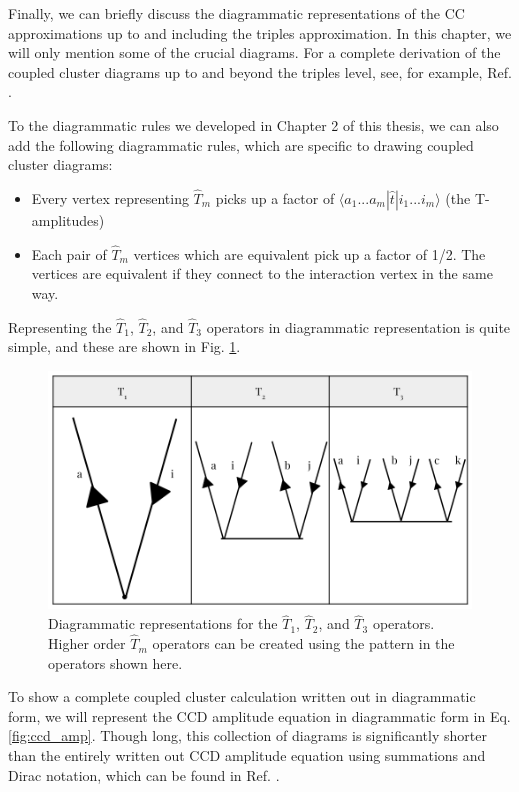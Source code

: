 Finally, we can briefly discuss the diagrammatic representations of the CC approximations up to and including the triples approximation. In this chapter, we will only mention some of the crucial diagrams. For a complete derivation of the coupled cluster diagrams up to and beyond the triples level, see, for example, Ref. \cite{Ref21}.

To the diagrammatic rules we developed in Chapter 2 of this thesis, we can also add the following diagrammatic rules, which are specific to drawing coupled cluster diagrams:

\begin{itemize}
    \item Every vertex representing $\hat{T}_m$ picks up a factor of $\langle a_1 ... a_m | \hat{t} | i_1 ... i_m \rangle$ (the T-amplitudes)
    \item Each pair of $\hat{T}_m$ vertices which are equivalent pick up a factor of 1/2.  The vertices are equivalent if they connect to the interaction vertex in the same way.
\end{itemize}

Representing the $\hat{T}_1$, $\hat{T}_2$, and $\hat{T}_3$ operators in diagrammatic representation is quite simple, and these are shown in Fig. \ref{fig:T_diagrams}.

\begin{figure}
    \centering
    \includegraphics[scale=0.25]{Images/Chapter3/CC_diagrams.png}
    \caption{Diagrammatic representations for the $\hat{T}_1$, $\hat{T}_2$, and $\hat{T}_3$ operators.  Higher order $\hat{T}_m$ operators can be created using the pattern in the operators shown here.}
    \label{fig:T_diagrams}
\end{figure}

To show a complete coupled cluster calculation written out in diagrammatic form, we will represent the CCD amplitude equation in diagrammatic form in Eq. \ref{fig:ccd_amp}.  Though long, this collection of diagrams is significantly shorter than the entirely written out CCD amplitude equation using summations and Dirac notation, which can be found in Ref. \cite{Ref8}.

